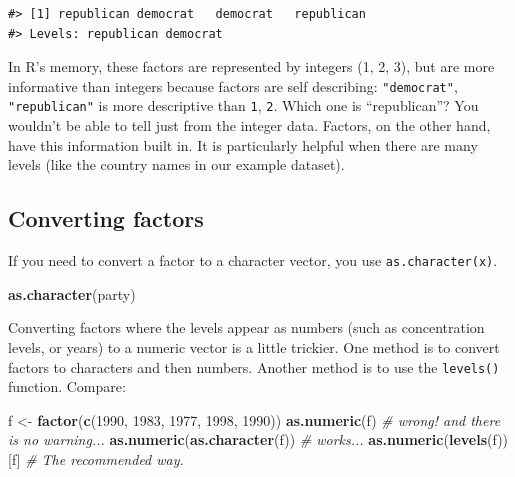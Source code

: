 \documentclass[]{book}
\newenvironment{Shaded}{\begin{snugshade}}{\end{snugshade}}
\newcommand{\KeywordTok}[1]{\textcolor[rgb]{0.13,0.29,0.53}{\textbf{{#1}}}}
\newcommand{\DecValTok}[1]{\textcolor[rgb]{0.00,0.00,0.81}{{#1}}}
\newcommand{\StringTok}[1]{\textcolor[rgb]{0.31,0.60,0.02}{{#1}}}
\newcommand{\CommentTok}[1]{\textcolor[rgb]{0.56,0.35,0.01}{\textit{{#1}}}}
\newcommand{\NormalTok}[1]{{#1}}
\theoremstyle{definition}
\theoremstyle{definition}
\theoremstyle{remark}
\begin{document}
\begin{verbatim}
#> [1] republican democrat   democrat   republican
#> Levels: republican democrat
\end{verbatim}

In R's memory, these factors are represented by integers (1, 2, 3), but
are more informative than integers because factors are self describing:
\texttt{"democrat"}, \texttt{"republican"} is more descriptive than
\texttt{1}, \texttt{2}. Which one is ``republican''? You wouldn't be
able to tell just from the integer data. Factors, on the other hand,
have this information built in. It is particularly helpful when there
are many levels (like the country names in our example dataset).

\subsection{Converting factors}\label{converting-factors}

If you need to convert a factor to a character vector, you use
\texttt{as.character(x)}.

\begin{Shaded}
\begin{Highlighting}[]
\KeywordTok{as.character}\NormalTok{(party)}
\end{Highlighting}
\end{Shaded}

Converting factors where the levels appear as numbers (such as
concentration levels, or years) to a numeric vector is a little
trickier. One method is to convert factors to characters and then
numbers. Another method is to use the \texttt{levels()} function.
Compare:

\begin{Shaded}
\begin{Highlighting}[]
\NormalTok{f <-}\StringTok{ }\KeywordTok{factor}\NormalTok{(}\KeywordTok{c}\NormalTok{(}\DecValTok{1990}\NormalTok{, }\DecValTok{1983}\NormalTok{, }\DecValTok{1977}\NormalTok{, }\DecValTok{1998}\NormalTok{, }\DecValTok{1990}\NormalTok{))}
\KeywordTok{as.numeric}\NormalTok{(f)               }\CommentTok{# wrong! and there is no warning...}
\KeywordTok{as.numeric}\NormalTok{(}\KeywordTok{as.character}\NormalTok{(f)) }\CommentTok{# works...}
\KeywordTok{as.numeric}\NormalTok{(}\KeywordTok{levels}\NormalTok{(f))[f]    }\CommentTok{# The recommended way.}
\end{Highlighting}
\end{Shaded}
\end{document}
